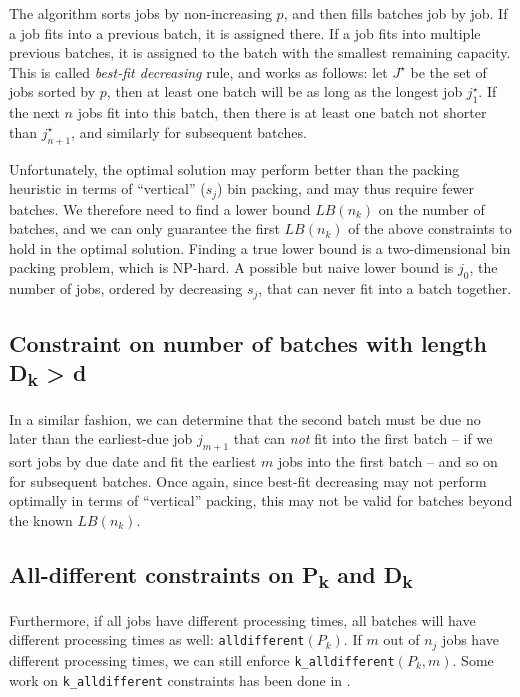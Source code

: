 \documentclass[13pt, letterpaper, oneside]{book}
\begin{document}
The algorithm sorts jobs by non-increasing $p$, and then fills batches job by
job. If a job fits into a previous batch, it is assigned there. If a job fits
into multiple previous batches, it is assigned to the batch with the smallest
remaining capacity. This is called \textit{best-fit decreasing} rule,
and works as follows: let $J^\star$ be the set of jobs sorted by $p$, then at
least one batch will be as long as the longest job $j^\star_1$. If the next $n$
jobs fit into this batch, then there is at least one batch not shorter than
$j^\star_{n+1}$, and similarly for subsequent batches. 

Unfortunately, the optimal solution may perform better than the packing heuristic in
terms of ``vertical'' ($s_j$) bin packing, and may thus require fewer batches.
We therefore need to find a lower bound $LB(n_k)$ on the number of batches, and
we can only guarantee the first $LB(n_k)$ of the above constraints to hold in
the optimal solution. Finding a true lower bound is a two-dimensional bin
packing problem, which is NP-hard. A possible but naive lower bound is $j_0$,
the number of jobs, ordered by decreasing $s_j$, that can never fit into a batch
together.

\subsection[Constraint on the number of batches with due date $D_k >
d$]{Constraint on number of batches with length {\sansitalicfont
D\textsubscript{k}} > {\sansitalicfont d}}

In a similar fashion, we can determine that the second batch must be due no
later than the earliest-due job $j_{m+1}$ that can \textit{not} fit into the first
batch -- if we sort jobs by due date and fit the earliest $m$ jobs into the first
batch -- and so on for subsequent batches. Once again, since best-fit decreasing
may not perform optimally in terms of ``vertical'' packing, this may not be
valid for batches beyond the known $LB(n_k)$.

\subsection[All-different constraints on $P_k$ and $D_k$]{All-different
constraints on {\sansitalicfont P\textsubscript{k}} and {\sansitalicfont
D\textsubscript{k}}}

Furthermore, if all jobs have different processing times, all batches will have
different processing times as well: \texttt{alldifferent}$(P_k)$. If $m$ out of
$n_j$ jobs have different processing times, we can still enforce
\texttt{k\_alldifferent}$(P_k, m)$. Some work on \texttt{k\_alldifferent}
constraints has been done in \citep{Lardeux}. 
\end{document}
